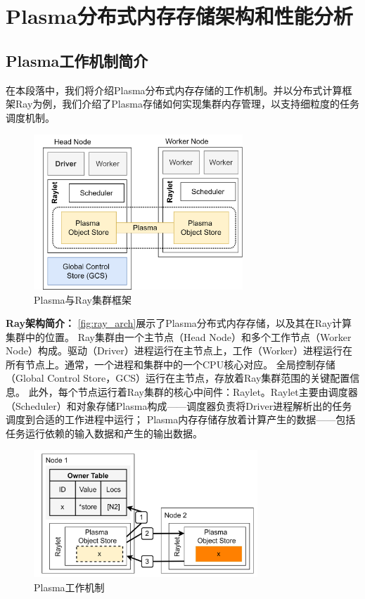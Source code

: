 \chapter{Plasma分布式内存存储架构和性能分析}

\section{Plasma工作机制简介}

在本段落中，我们将介绍Plasma分布式内存存储的工作机制。并以分布式计算框架Ray为例，我们介绍了Plasma存储如何实现集群内存管理，以支持细粒度的任务调度机制。

\begin{figure}[h] 
    \centering
    \includegraphics[width=0.7\textwidth]{image/chap02/ray_arch.png}
    \caption{Plasma与Ray集群框架}
    \label{fig:ray_arch}
\end{figure}

\textbf{Ray架构简介：}
\autoref{fig:ray_arch}展示了Plasma分布式内存存储，以及其在Ray计算集群中的位置。
Ray集群由一个主节点（Head Node）和多个工作节点（Worker Node）构成。驱动（Driver）进程运行在主节点上，工作（Worker）进程运行在所有节点上。通常，一个进程和集群中的一个CPU核心对应。
全局控制存储（Global Control Store，GCS）运行在主节点，存放着Ray集群范围的关键配置信息。
此外，每个节点运行着Ray集群的核心中间件：Raylet。Raylet主要由调度器（Scheduler）和对象存储Plasma构成——调度器负责将Driver进程解析出的任务调度到合适的工作进程中运行；
Plasma内存存储存放着计算产生的数据——包括任务运行依赖的输入数据和产生的输出数据。

\begin{figure}[h] 
    \centering
    \includegraphics[width=0.75\textwidth]{image/chap02/object_fetch.png}
    \caption{Plasma工作机制}
    \label{fig:object_fetch}
\end{figure}

